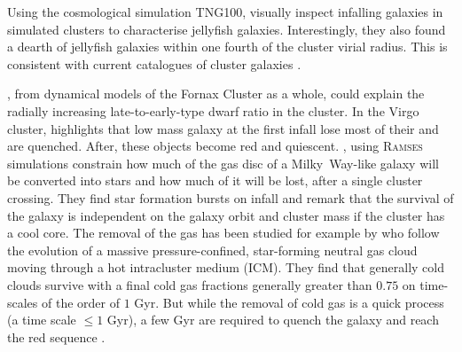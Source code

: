 Using the cosmological simulation TNG100, \citet{Yun2018} visually inspect infalling galaxies in simulated clusters to characterise jellyfish galaxies.
Interestingly, they also found a dearth of jellyfish galaxies within one fourth of the cluster virial radius.
This is consistent with current catalogues of cluster galaxies \citep{Lisker2006, Venhola2019}.


\citet{DeRijcke2010}, from dynamical models of the Fornax Cluster as a whole, could explain the radially increasing late-to-early-type dwarf ratio in the cluster.
In the Virgo cluster, \citet{Boselli2008} highlights that low mass galaxy at the first infall lose most of their \Hi{} and are quenched.
After, these objects become red and quiescent.
\citet{Ruggiero2017}, using \textsc{Ramses} simulations constrain how much of the gas disc of a Milky~Way-like galaxy will be converted into stars and how much of it will be lost, after a single cluster crossing.
They find star formation bursts on infall and remark that the survival of the galaxy is independent on the galaxy orbit and cluster mass if the cluster has a cool core.
The removal of the gas has been studied for example by \cite{Calura2020} who follow the evolution of a massive pressure-confined, star-forming neutral gas cloud moving through a hot intracluster medium (ICM).
They find that generally cold clouds survive with a final cold gas fractions generally greater than $0.75$ on time-scales of the order of $1$ Gyr.
But while the removal of cold gas is a quick process (a time scale $\leq1$ Gyr), a few Gyr are required to quench the galaxy and reach the red sequence \citep{Cortese2009}.



